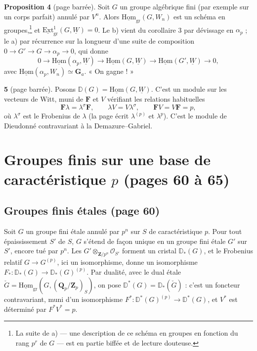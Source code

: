 \documentclass[11pt,a4paper]{article}
\begin{document}
\textbf{Proposition 4} (page barrée). Soit $G$ un groupe algébrique fini (par
exemple sur un corps parfait) annulé par $V^n$. Alors
$\underline{\mathrm{Hom}}_{\mathrm{gr}}(G, W_n)$ est un schéma en
groupes,\footnote{La suite de a) — une description de ce schéma en groupes en
fonction du rang $p^r$ de $G$ — est en partie biffée et de lecture douteuse.} et
$\underline{\mathrm{Ext}}^1_{\mathrm{gr}}(G, \underline{W}) = 0$. Le b) vient du
corollaire 3 par dévissage en $\alpha_p$ ; le a) par récurrence sur la longueur
d'une suite de composition $0 \to G' \to G \to \alpha_p \to 0$, qui donne
\[
  0 \to \underline{\mathrm{Hom}}(\alpha_p, \underline{W}) \to
  \underline{\mathrm{Hom}}(G, \underline{W}) \to
  \underline{\mathrm{Hom}}(G', \underline{W}) \to 0 ,
\]
avec $\underline{\mathrm{Hom}}(\alpha_p, W_n) \simeq \mathbf{G}_a$. « On gagne ! »

\textbf{5} (page barrée). Posons $\mathbb{D}(G) = \underline{\mathrm{Hom}}(G,
\underline{W})$. C'est un module sur les vecteurs de Witt, muni de $\mathbf{F}$
et $V$ vérifiant les relations habituelles
\[
  \mathbf{F}\lambda = \lambda^{\sigma}\mathbf{F}, \qquad
  \lambda V = V\lambda^{\sigma}, \qquad
  \mathbf{F}V = V\mathbf{F} = p ,
\]
où $\lambda^\sigma$ est le Frobenius de $\lambda$ (la page écrit
$\lambda^{(p)}$ et $\lambda^p$). C'est le module de Dieudonné contravariant à
la Demazure--Gabriel.

\section*{Groupes finis sur une base de caractéristique $p$ (pages 60 à 65)}

\subsection*{Groupes finis étales (page 60)}

Soit $G$ un groupe fini étale annulé par $p^n$ sur $S$ de caractéristique $p$.
Pour tout épaississement $S'$ de $S$, $G$ s'étend de façon unique en un groupe
fini étale $G'$ sur $S'$, encore tué par $p^n$. Les
$G' \otimes_{\mathbf{Z}/p^n} \mathcal{O}_{S'}$ forment un cristal
$\mathbb{D}_*(G)$, et le Frobenius relatif $G \to G^{(p)}$, ici un
isomorphisme, donne un isomorphisme $F_* : \mathbb{D}_*(G) \to
\mathbb{D}_*(G)^{(p)}$. Par dualité, avec le dual étale
$\check G = \underline{\mathrm{Hom}}_{\mathrm{gr}}(G, (\mathbf{Q}_p/\mathbf{Z}_p)_S)$,
on pose $\mathbb{D}^*(G) = \mathbb{D}_*(\check G)$ : c'est un foncteur
contravariant, muni d'un isomorphisme $F^* : \mathbb{D}^*(G)^{(p)} \to
\mathbb{D}^*(G)$, et $V^*$ est déterminé par $F^*V^* = p$.
\end{document}
